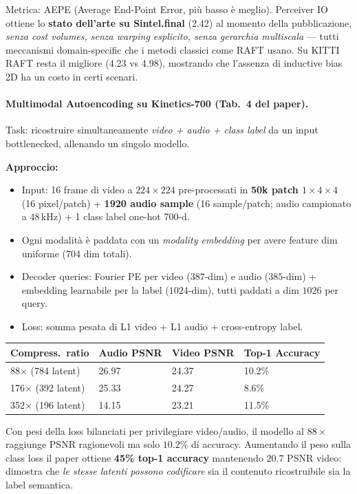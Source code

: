 \documentclass[
  11pt,
]{article}
\begin{document}
Metrica: AEPE (Average End-Point Error, più basso è meglio). Perceiver IO ottiene lo \textbf{stato dell'arte su Sintel.final} (2.42) al momento della pubblicazione, \emph{senza cost volumes, senza warping esplicito, senza gerarchia multiscala} --- tutti meccanismi domain-specific che i metodi classici come RAFT usano. Su KITTI RAFT resta il migliore (4.23 vs 4.98), mostrando che l'assenza di inductive bias 2D ha un costo in certi scenari.

\paragraph{Multimodal Autoencoding su Kinetics-700 (Tab.\ 4 del paper).} Task: ricostruire simultaneamente \emph{video + audio + class label} da un input bottlenecked, allenando un singolo modello.

\textbf{Approccio:}
\begin{itemize}\setlength\itemsep{0.1em}
\item Input: 16 frame di video a $224\times224$ pre-processati in \textbf{50k patch $1\times 4\times 4$} (16 pixel/patch) + \textbf{1920 audio sample} (16 sample/patch; audio campionato a 48\,kHz) + 1 class label one-hot 700-d.
\item Ogni modalità è paddata con un \emph{modality embedding} per avere feature dim uniforme (704 dim totali).
\item Decoder queries: Fourier PE per video ($387$-dim) e audio ($385$-dim) + embedding learnabile per la label ($1024$-dim), tutti paddati a dim $1026$ per query.
\item Loss: somma pesata di L1 video + L1 audio + cross-entropy label.
\end{itemize}

{\small
\begin{longtable}{@{}p{3cm} p{2.5cm} p{2.5cm} p{3cm}@{}}
\toprule
\textbf{Compress.\ ratio} & \textbf{Audio PSNR} & \textbf{Video PSNR} & \textbf{Top-1 Accuracy} \\
\midrule
\endhead
88$\times$ (784 latent) & 26.97 & 24.37 & 10.2\% \\[2pt]
176$\times$ (392 latent) & 25.33 & 24.27 & 8.6\% \\[2pt]
352$\times$ (196 latent) & 14.15 & 23.21 & 11.5\% \\
\bottomrule
\end{longtable}
}

\begin{notabox}[title={\textbf{Trade-off ricostruzione vs classificazione}}]
Con pesi della loss bilanciati per privilegiare video/audio, il modello al $88\times$ raggiunge PSNR ragionevoli ma solo $10.2\%$ di accuracy. Aumentando il peso sulla class loss il paper ottiene \textbf{45\% top-1 accuracy} mantenendo $20.7$ PSNR video: dimostra che \emph{le stesse latenti possono codificare} sia il contenuto ricostruibile sia la label semantica.
\end{notabox}
\end{document}
